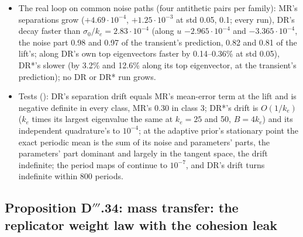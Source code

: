\begin{itemize}
    0.277.
  \item The real loop on common noise paths (four antithetic pairs per family): MR's separations grow
    ($+4.69\cdot10^{-4}$, $+1.25\cdot10^{-3}$ at std 0.05, 0.1; every run), DR's decay faster than
    $\sigma_0/k_e=2.83\cdot10^{-4}$ (along $u$ $-2.965\cdot10^{-4}$ and $-3.365\cdot10^{-4}$, the noise part 0.98 and
    0.97 of the transient's prediction, 0.82 and 0.81 of the lift's; along DR's own top eigenvectors faster by
    0.14--0.36\% at std 0.05), DR*'s slower (by 3.2\% and 12.6\% along its top eigenvector, at the transient's
    prediction); no DR or DR* run grows.
  \item Tests (): DR's separation drift equals MR's mean-error term at the lift and is
    negative definite in every class, MR's 0.30 in class 3; DR*'s drift is $O(1/k_e)$ ($k_e$ times its largest
    eigenvalue the same at $k_e=25$ and 50, $B=4k_e$) and its independent quadrature's to $10^{-4}$; at the adaptive
    prior's stationary point the exact periodic mean is the sum of its noise and parameters' parts, the parameters'
    part dominant and largely in the tangent space, the drift indefinite; the period maps of 
    continue  to $10^{-7}$, and DR's drift turns indefinite within 800 periods.
\end{itemize}

\subsection{Proposition D\texorpdfstring{$'''$}{'''}.34: mass transfer: the replicator weight law with the cohesion
leak}

